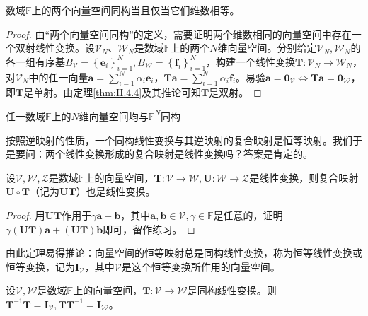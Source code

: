 \documentclass[main.tex]{subfiles}
\begin{document}
\begin{theorem}\label{thm:II.4.6}
数域$\mathbb{F}$上的两个向量空间同构当且仅当它们维数相等。
\end{theorem}
\begin{proof}
由“两个向量空间同构”的定义，需要证明两个维数相同的向量空间中存在一个双射线性变换。设$\mathcal{V}_N$、$\mathcal{W}_N$是数域$\mathbb{F}$上的两个$N$维向量空间。分别给定$\mathcal{V}_N,\mathcal{W}_N$的各一组有序基$B_\mathcal{V}=\left\{\mathbf{e}_i\right\}_{i=1}^N, B_\mathcal{W}=\left\{\mathbf{f}_i\right\}_{i=1}^N$，构建一个线性变换$\mathbf{T}:\mathcal{V}_N\rightarrow\mathcal{W}_N$，对$\mathcal{V}_N$中的任一向量$\mathbf{a}=\sum_{i=1}^N\alpha_i\mathbf{e}_i$，$\mathbf{Ta}=\sum_{i=1}^N\alpha_i\mathbf{f}_i$。易验$\mathbf{a}=\mathbf{0}_\mathcal{V}\Leftrightarrow\mathbf{Ta}=\mathbf{0}_\mathcal{W}$，即$\mathbf{T}$是单射。由定理\ref{thm:II.4.4}及其推论可知$\mathbf{T}$是双射。
\end{proof}

\begin{corollary}
任一数域$\mathbb{F}$上的$N$维向量空间均与$\mathbb{F}^N$同构
\end{corollary}

按照逆映射的性质，一个同构线性变换与其逆映射的复合映射是恒等映射。我们于是要问：两个线性变换形成的复合映射是线性变换吗？答案是肯定的。

\begin{theorem}\label{thm:II.4.7}
设$\mathcal{V},\mathcal{W},\mathcal{Z}$是数域$\mathbb{F}$上的向量空间，$\mathbf{T}:\mathcal{V}\rightarrow\mathcal{W},\mathbf{U}:\mathcal{W}\rightarrow\mathcal{Z}$是线性变换，则复合映射$\mathbf{U}\circ\mathbf{T}$（记为$\mathbf{UT}$）也是线性变换。
\end{theorem}
\begin{proof}
用$\mathbf{UT}$作用于$\gamma\mathbf{a}+\mathbf{b}$，其中$\mathbf{a},\mathbf{b}\in\mathcal{V},\gamma\in\mathbb{F}$是任意的，证明$\gamma\left(\mathbf{UT}\right)\mathbf{a}+\left(\mathbf{UT}\right)\mathbf{b}$即可，留作练习。
\end{proof}

由此定理易得推论：向量空间的恒等映射总是同构线性变换，称为恒等线性变换或恒等变换，记为$\mathbf{I}_\mathcal{V}$，其中$\mathcal{V}$是这个恒等变换所作用的向量空间。

\begin{example}
设$\mathcal{V},\mathcal{W}$是数域$\mathbb{F}$上的向量空间，$\mathbf{T}:\mathcal{V}\rightarrow\mathcal{W}$是同构线性变换。则$\mathbf{T}^{-1}\mathbf{T}=\mathbf{I}_\mathcal{V},\mathbf{TT}^{-1}=\mathbf{I}_\mathcal{W}$。
\end{example}
\end{document}

